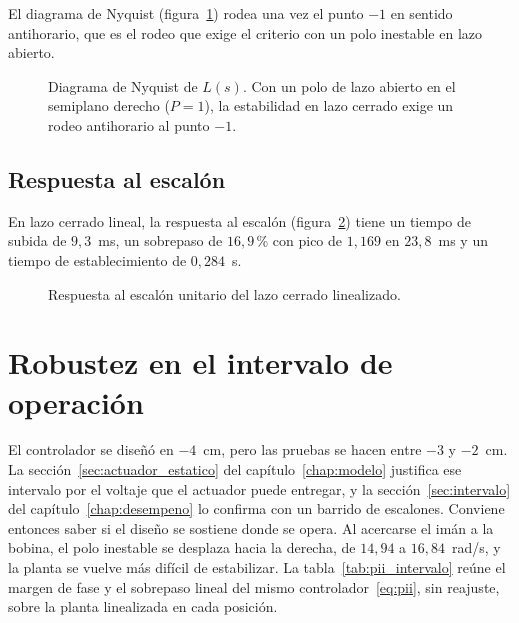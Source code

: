 El diagrama de Nyquist (figura~\ref{nyquist}) rodea una vez el punto $-1$ en sentido antihorario, que es el rodeo que exige el criterio con un polo inestable en lazo abierto.

\begin{figure}[ht]
    \centering
    
    \caption[Diagrama de Nyquist]{Diagrama de Nyquist de $L(s)$. Con un polo de lazo abierto en el semiplano derecho ($P=1$), la estabilidad en lazo cerrado exige un rodeo antihorario al punto $-1$.}
    \label{nyquist}
\end{figure}

\subsection{Respuesta al escalón}

En lazo cerrado lineal, la respuesta al escalón (figura~\ref{step_response}) tiene un tiempo de subida de $9{,}3$~ms, un sobrepaso de $16{,}9$\,\% con pico de $1{,}169$ en $23{,}8$~ms y un tiempo de establecimiento de $0{,}284$~s.

\begin{figure}[ht]
    \centering
    
    \caption[Respuesta al escalón]{Respuesta al escalón unitario del lazo cerrado linealizado.}
    \label{step_response}
\end{figure}

\section{Robustez en el intervalo de operación}\label{sec:robustez_pii}

El controlador se diseñó en $-4$~cm, pero las pruebas se hacen entre $-3$ y $-2$~cm. La sección~\ref{sec:actuador_estatico} del capítulo~\ref{chap:modelo} justifica ese intervalo por el voltaje que el actuador puede entregar, y la sección~\ref{sec:intervalo} del capítulo~\ref{chap:desempeno} lo confirma con un barrido de escalones. Conviene entonces saber si el diseño se sostiene donde se opera. Al acercarse el imán a la bobina, el polo inestable se desplaza hacia la derecha, de $14{,}94$ a $16{,}84$~rad/s, y la planta se vuelve más difícil de estabilizar. La tabla~\ref{tab:pii_intervalo} reúne el margen de fase y el sobrepaso lineal del mismo controlador~\eqref{eq:pii}, sin reajuste, sobre la planta linealizada en cada posición.

